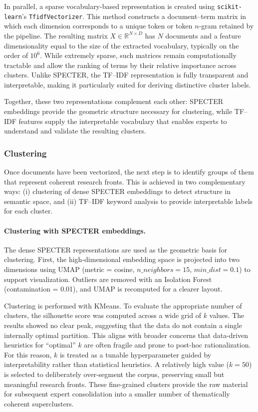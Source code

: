 \documentclass{article}
\begin{document}
In parallel, a sparse vocabulary-based representation is created using \texttt{scikit-learn}’s \texttt{TfidfVectorizer}. \cite{pedregosa2011scikit} This method constructs a document–term matrix in which each dimension corresponds to a unique token or token $n$-gram retained by the pipeline. The resulting matrix \(X \in \mathbb{R}^{N \times D}\) has $N$ documents and a feature dimensionality equal to the size of the extracted vocabulary, typically on the order of $10^{6}$. While extremely sparse, such matrices remain computationally tractable and allow the ranking of terms by their relative importance across clusters. Unlike SPECTER, the TF–IDF representation is fully transparent and interpretable, making it particularly suited for deriving distinctive cluster labels.  

Together, these two representations complement each other: SPECTER embeddings provide the geometric structure necessary for clustering, while TF–IDF features supply the interpretable vocabulary that enables experts to understand and validate the resulting clusters.



\subsubsection{Clustering}

Once documents have been vectorized, the next step is to identify groups of them that represent coherent research fronts. This is achieved in two complementary ways: (i) clustering of dense SPECTER embeddings to detect structure in semantic space, and (ii) TF–IDF keyword analysis to provide interpretable labels for each cluster.

\paragraph{Clustering with SPECTER embeddings.}  
The dense SPECTER representations are used as the geometric basis for clustering. First, the high-dimensional embedding space is projected into two dimensions using UMAP (metric = cosine, $n\_neighbors = 15$, $min\_dist = 0.1$) to support visualization. Outliers are removed with an Isolation Forest (contamination = 0.01), and UMAP is recomputed for a clearer layout.  

Clustering is performed with KMeans. To evaluate the appropriate number of clusters, the silhouette score was computed across a wide grid of \(k\) values. The results showed no clear peak, suggesting that the data do not contain a single internally optimal partition. This aligns with broader concerns that data-driven heuristics for “optimal” \(k\) are often fragile and prone to post-hoc rationalization.\cite{bulatov2024determination} For this reason, \(k\) is treated as a tunable hyperparameter guided by interpretability rather than statistical heuristics. A relatively high value (\(k = 50\)) is selected to deliberately over-segment the corpus, preserving small but meaningful research fronts. These fine-grained clusters provide the raw material for subsequent expert consolidation into a smaller number of thematically coherent superclusters.
\end{document}

